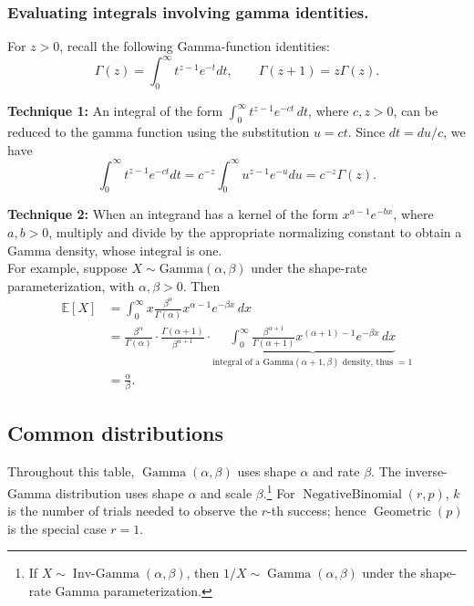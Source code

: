 \documentclass{article}
\theoremstyle{break}
\newcommand{\E}{\ensuremath{\mathbb{E}}}
\DeclareMathOperator{\Geometric}{Geometric}
\DeclareMathOperator{\NegativeBinomial}{NegativeBinomial}
\begin{document}
\subsubsection{Evaluating integrals involving gamma identities.}
For $z>0$, recall the following Gamma-function identities:
\[
\Gamma(z)=\int_0^\infty t^{z-1}e^{-t} dt,
\qquad
\Gamma(z+1)=z\Gamma(z).
\]

\textbf{Technique 1:} An integral of the form $\int_0^\infty t^{z-1}e^{-ct}\,dt$, where $c,z>0$, can be reduced to the gamma function using the substitution $u=ct$. Since $dt=du/c$, we have
\[
\int_0^\infty t^{z-1}e^{-ct} dt 
= c^{-z} \int_0^\infty u^{z-1}e^{-u} du 
= c^{-z}\Gamma(z).
\]

\textbf{Technique 2:} When an integrand has a kernel of the form $x^{a-1}e^{-bx}$, where $a,b>0$, multiply and divide by the appropriate normalizing constant to obtain a Gamma density, whose integral is one.\\
For example, suppose $X\sim\mathrm{Gamma}(\alpha,\beta)$ under the shape-rate parameterization, with $\alpha,\beta>0$. Then
\begin{align*}
\E[X]
&=\int_0^\infty x\frac{\beta^\alpha}{\Gamma(\alpha)}
    x^{\alpha-1}e^{-\beta x}\,dx\\
&=\frac{\beta^\alpha}{\Gamma(\alpha)} \cdot \frac{\Gamma(\alpha+1)}{\beta^{\alpha+1}} \cdot
\underbrace{\int_0^\infty
    \frac{\beta^{\alpha+1}}{\Gamma(\alpha+1)}
    x^{(\alpha+1)-1} e^{-\beta x}\,dx}_{\text{integral of a $\mathrm{Gamma}(\alpha+1,\beta)$ density, thus } =1}\\
&=\frac{\alpha}{\beta}.
\end{align*}



\subsection{Common distributions}\label{sec:misc-common-dist}
Throughout this table, $\operatorname{Gamma}(\alpha,\beta)$ uses shape $\alpha$ and rate $\beta$. 
The inverse-Gamma distribution uses shape $\alpha$ and scale $\beta$.\footnote{If $X\sim\operatorname{Inv\text{-}Gamma}(\alpha,\beta)$, then $1/X\sim\operatorname{Gamma}(\alpha,\beta)$ under the shape-rate Gamma parameterization.}
For $\NegativeBinomial(r,p)$, $k$ is the number of trials needed to observe the $r$-th success; hence $\Geometric(p)$ is the special case $r=1$.

\begingroup
\scriptsize
\setlength{\tabcolsep}{3pt}
\renewcommand{\arraystretch}{1.7}
\end{document}
